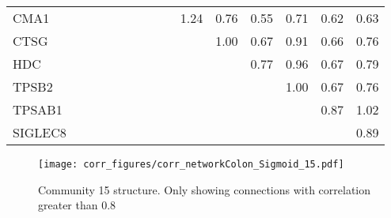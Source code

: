 \begin{longtable}{lrrrrrrrrrrrrrr}
CMA1     &                &             &            &                &             &               &             &            &       1.24 &      0.76 &        0.55 &         0.71 &          0.62 &          0.63 \\
CTSG     &                &             &            &                &             &               &             &            &            &      1.00 &        0.67 &         0.91 &          0.66 &          0.76 \\
HDC      &                &             &            &                &             &               &             &            &            &           &        0.77 &         0.96 &          0.67 &          0.79 \\
TPSB2    &                &             &            &                &             &               &             &            &            &           &             &         1.00 &          0.67 &          0.76 \\
TPSAB1   &                &             &            &                &             &               &             &            &            &           &             &              &          0.87 &          1.02 \\
SIGLEC8  &                &             &            &                &             &               &             &            &            &           &             &              &               &          0.89 \\
\end{longtable}


\begin{figure}[h!]
\centering
\texttt{[image: corr\_figures/corr\_networkColon\_Sigmoid\_15.pdf]}
\caption{Community 15 structure. Only showing connections with correlation greater than 0.8}
\end{figure}



